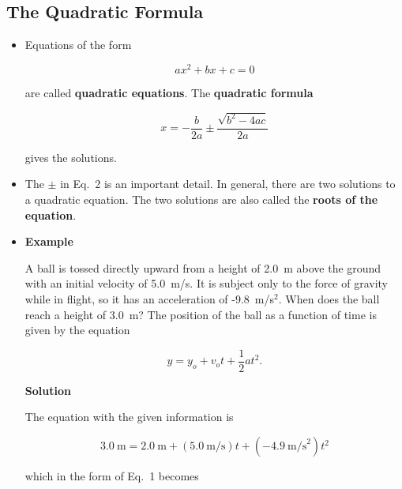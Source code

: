 \documentclass[12pt]{article}
\begin{document}
\begin{latexonly}
\subsection*{The Quadratic Formula}
\end{latexonly}

\begin{itemize}
\item Equations of the form

  \begin{equation}
    \label{eq:quadratic}
    ax^2 + bx + c = 0
  \end{equation}

  \noindent
  are called \textbf{quadratic equations}. The \textbf{quadratic formula}

  \begin{equation}
    \label{eq:qFormula}
    x = -\frac{b}{2a} \pm \frac{\sqrt{b^2 - 4ac}}{2a}
  \end{equation}

  \noindent
  gives the solutions.

\item The $\pm$ in Eq.~2 %
  is an important detail. In general, there are two solutions to a
  quadratic equation. The two solutions are also called the
  \textbf{roots of the equation}.

\item \textbf{Example}

  A ball is tossed directly upward from a height of 2.0~m above the ground
  with an initial velocity of 5.0~m/s. It is subject only to the force
  of gravity while in flight, so it has an acceleration of
  -9.8~m/s$^2$. When does the ball reach a height of 3.0~m? The position
  of the ball as a function of time is given by the equation

  \begin{equation}
    y = y_o + v_o t + \frac{1}{2}a t^2.
  \end{equation}

  \textbf{Solution}

  The equation with the given information is

  \begin{equation}
    3.0~\mathrm{m} = 2.0~\mathrm{m} + (5.0~\mathrm{m/s}) t 
    + (-4.9~\mathrm{m/s}^2) t^2
  \end{equation}

  \noindent
  which in the form of Eq.~1 %
  becomes


\end{itemize}
\end{document}
